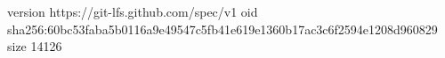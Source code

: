 version https://git-lfs.github.com/spec/v1
oid sha256:60bc53faba5b0116a9e49547c5fb41e619e1360b17ac3c6f2594e1208d960829
size 14126
